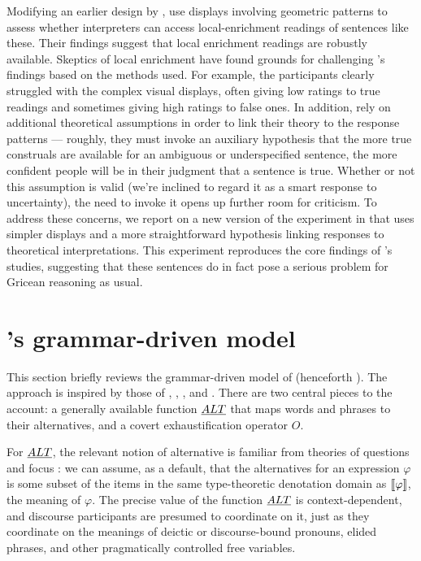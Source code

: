 \documentclass[leqno]{article}
\begin{document}
Modifying an earlier design by \citet{Geurts:Pouscoulous:2009},
\citeauthor{Chemla:Spector:2011} use displays involving geometric
patterns to assess whether interpreters can access local-enrichment
readings of sentences like these. Their findings suggest that local
enrichment readings are robustly available. Skeptics of local
enrichment have found grounds for challenging
\citeauthor{Chemla:Spector:2011}'s findings based on the methods
used. For example, the participants clearly struggled with the complex
visual displays, often giving low ratings to true readings and
sometimes giving high ratings to false ones. In addition,
\citeauthor{Chemla:Spector:2011} rely on additional theoretical
assumptions in order to link their theory to the response patterns ---
roughly, they must invoke an auxiliary hypothesis that the more true
construals are available for an ambiguous or underspecified sentence,
the more confident people will be in their judgment that a sentence is
true. Whether or not this assumption is valid (we're inclined to
regard it as a smart response to uncertainty), the need to invoke it
opens up further room for criticism. To address these concerns, we
report on a new version of the experiment in  that
uses simpler displays and a more straightforward hypothesis linking
responses to theoretical interpretations. This experiment reproduces
the core findings of \citeauthor{Chemla:Spector:2011}'s studies,
suggesting that these sentences do in fact pose a serious problem for
Gricean reasoning as usual.


\section{\CFS's grammar-driven model}\label{sec:cfs}

This section briefly reviews the grammar-driven model of
\citet{ChierchiaFoxSpector08} (henceforth \CFS).  The approach is
inspired by those of \citet{Chierchia01}, \citet{Sauerland01},
\citet{Spector:2007}, and \citet{Fox:2007,Fox:2009}. There are two
central pieces to the account: a generally available function $\emph{ALT}$
that maps words and phrases to their alternatives, and a covert
exhaustification operator $O$.

For $\emph{ALT}$, the relevant notion of alternative is familiar from
theories of questions and focus \citep{Groenendijk84,Rooth85,Rooth92}:
we can assume, as a default, that the alternatives for an expression
$\varphi$ is some subset of the items in the same type-theoretic
denotation domain as $\llbracket\varphi\rrbracket$, the meaning of $\varphi$. 
The precise value of the function $\emph{ALT}$ is context-dependent, and
discourse participants are presumed to coordinate on it, just as they
coordinate on the meanings of deictic or discourse-bound pronouns,
elided phrases, and other pragmatically controlled free variables.
\end{document}
